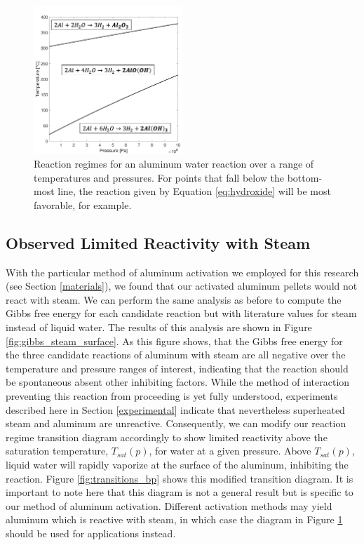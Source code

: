\documentclass[preprint,12pt,3p]{elsarticle}
\begin{document}
\begin{figure}
  \centering
  \includegraphics[width=0.5\textwidth]{fig/transitions}
  \caption{Reaction regimes for an aluminum water reaction over a range of
  temperatures and pressures. For points that fall below the bottom-most line,
the reaction given by Equation \ref{eq:hydroxide} will be most favorable, for
example.}
  \label{fig:transitions}
\end{figure}

\subsection{Observed Limited Reactivity with Steam}

With the particular method of aluminum activation we employed for this research
(see Section \ref{materials}), we found that our activated aluminum pellets
would not react with steam. We can perform the same analysis as before to
compute the Gibbs free energy for each candidate reaction but with literature
values for steam instead of liquid water. The results of this analysis are shown
in Figure \ref{fig:gibbs_steam_surface}. As this figure shows, that the Gibbs
free energy for the three candidate reactions of aluminum with steam are all
negative over the temperature and pressure ranges of interest, indicating that
the reaction should be spontaneous absent other inhibiting factors. While the
method of interaction preventing this reaction from proceeding is yet fully
understood, experiments described here in Section \ref{experimental} indicate
that nevertheless superheated steam and aluminum are unreactive. Consequently,
we can modify our reaction regime transition diagram accordingly to show limited
reactivity above the saturation temperature, $T_{sat}(p)$, for water at a given
pressure. Above $T_{sat}(p)$, liquid water will rapidly vaporize at the surface
of the aluminum, inhibiting the reaction. Figure \ref{fig:transitions_bp} shows
this modified transition diagram. It is important to note here that this diagram
is not a general result but is specific to our method of aluminum activation.
Different activation methods may yield aluminum which is reactive with steam, in
which case the diagram in Figure \ref{fig:transitions} should be used for
applications instead.
\end{document}
